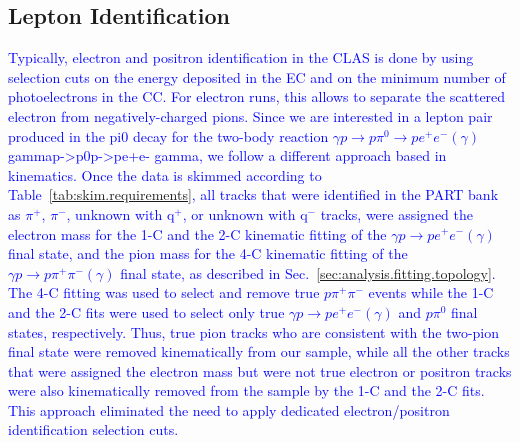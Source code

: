 \subsection{Lepton Identification}
  \textcolor{blue}{Typically, electron and positron identification in the CLAS is done by using selection cuts on the energy deposited in the EC and on the minimum number 
  of photoelectrons in the CC. For electron runs, this allows to separate the scattered electron from negatively-charged pions. Since we are interested in a 
  lepton pair produced in the pi0 decay for the two-body reaction $\gamma p\rightarrow p \pi^0 \rightarrow pe^+e^- (\gamma)$gammap->p0p->pe+e- gamma, we follow a different approach based in kinematics. 
  Once the data is skimmed according to Table~\ref{tab:skim.requirements}, all tracks that were identified in the PART bank as  $\pi^+$, $\pi^-$, unknown with q$^+$, or unknown with q$^-$ 
  tracks, were assigned the electron mass for the 1-C and the 2-C kinematic fitting of the $\gamma p\rightarrow pe^+e^- (\gamma)$ final state, and the pion mass for the 4-C 
  kinematic fitting of the $\gamma p\rightarrow p\pi^+\pi^- (\gamma)$ final state, as described in Sec.~\ref{sec:analysis.fitting.topology}. The 4-C fitting was used to select and remove true $p\pi^+\pi^-$ events while 
  the 1-C and the 2-C fits were used to select only true $\gamma p\rightarrow pe^+e^- (\gamma)$ and $p\pi^0$ final states, respectively. Thus, true pion tracks who are consistent with the 
  two-pion final state were removed kinematically from our sample, while all the other tracks that were assigned the electron mass but were not true 
  electron or positron tracks were also kinematically removed from the sample by the 1-C and the 2-C fits. This approach eliminated the need to apply 
  dedicated electron/positron identification selection cuts.}
   
   
	
